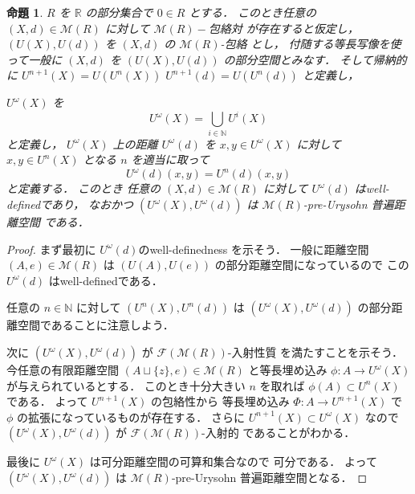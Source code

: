 \documentclass[leqno, 12pt]{jsarticle}
\newtheorem{prop}[thm]{命題}
\newcommand{\nn}{\mathbb{N}}
\newcommand{\rr}{\mathbb{R}}
\begin{document}
\begin{prop}\label{prop:func:envext}
$R$
を
$\rr$
の部分集合で
$0\in R$
とする．
このとき任意の
$(X, d)\in\mathscr{M}(R)$
に対して
$\mathscr{M}(R)-$包絡対
が存在すると仮定し，
$(U(X), U(d))$
を
$(X, d)$
の
$\mathscr{M}(R)$-包絡
とし，
付随する等長写像を使って一般に
$(X, d)$
を
$(U(X), U(d))$
の部分空間とみなす．
そして帰納的に
$U^{n+1}(X)=U(U^{n}(X))$
$U^{n+1}(d)=U(U^{n}(d))$
と定義し，

$U^{\omega}(X)$
を
\[
U^{\omega}(X)=\bigcup_{i\in \nn}U^{i}(X)
\]
と定義し，
$U^{\omega}(X)$
上の距離
$U^{\omega}(d)$
を
$x, y\in U^{\omega}(X)$
に対して
$x, y\in U^{n}(X)$
となる
$n$
を適当に取って
\[
U^{\omega}(d)(x, y)=
U^n(d)(x, y)
\]
と定義する．
このとき
任意の
$(X, d)\in \mathscr{M}(R)$
に対して
$U^{\omega}(d)$
はwell-definedであり，
なおかつ
$(U^{\omega}(X), U^{\omega}(d))$
は
$\mathscr{M}(R)$-pre-Urysohn
普遍距離空間
である．
\end{prop}
\begin{proof}
まず最初に
$U^{\omega}(d)$のwell-definedness
を示そう．
一般に距離空間
$(A, e)\in \mathscr{M}(R)$
は
$(U(A), U(e))$
の部分距離空間になっているので
この
$U^{\omega}(d)$
はwell-definedである．




任意の
$n\in \nn$
に対して
$(U^{n}(X), U^{n}(d))$
は
$(U^{\omega}(X), U^{\omega}(d))$
の部分距離空間であることに注意しよう．



次に
$(U^{\omega}(X), U^{\omega}(d))$
が
$\mathscr{F}(\mathscr{M}(R))$-入射性質
を満たすことを示そう．
今任意の有限距離空間
$(A\sqcup\{z\}, e)\in \mathscr{M}(R)$
と等長埋め込み
$\phi\colon  A\to U^{\omega}(X)$
が与えられているとする．
このとき十分大きい
$n$
を取れば
$\phi(A)\subset U^{n}(X)$
である．
よって
$U^{n+1}(X)$
の包絡性から
等長埋め込み
$\Phi\colon  A\to U^{n+1}(X)$
で
$\phi$
の拡張になっているものが存在する．
さらに
$U^{n+1}(X)\subset U^{\omega}(X)$
なので
$(U^{\omega}(X), U^{\omega}(d))$
が
$\mathscr{F}(\mathscr{M}(R))$-入射的
であることがわかる．



最後に
$U^{\omega}(X)$
は可分距離空間の可算和集合なので
可分である．
よって
$(U^{\omega}(X), U^{\omega}(d))$
は
$\mathscr{M}(R)$-pre-Urysohn
普遍距離空間となる．
\end{proof}
\end{document}
